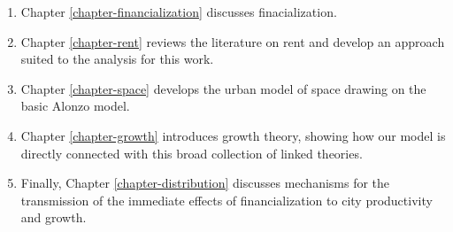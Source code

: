 \begin{enumerate}
    \item Chapter \ref{chapter-financialization} discusses finacialization. %
    \item     Chapter \ref{chapter-rent} reviews the literature on rent and develop an approach suited to the analysis for this work.
    \item Chapter \ref{chapter-space} develops the urban model of space drawing on the basic Alonzo model.
    \item Chapter \ref{chapter-growth} introduces growth theory, showing how our model is directly connected with this broad collection of linked theories. %
    \item Finally, Chapter \ref{chapter-distribution} discusses mechanisms for the transmission of the immediate effects of financialization to city productivity and growth.
\end{enumerate}
 
